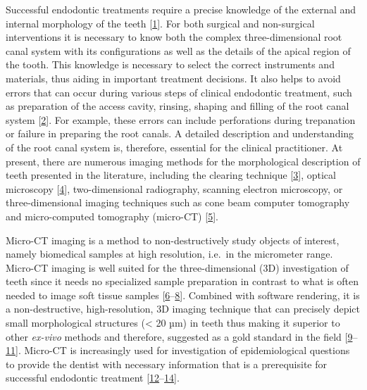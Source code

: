 \documentclass[
  american,
]{article}
\begin{document}
Successful endodontic treatments require a precise knowledge of the external and internal morphology of the teeth {[}\protect\hyperlink{ref-q3HKadWY}{1}{]}.
For both surgical and non-surgical interventions it is necessary to know both the complex three-dimensional root canal system with its configurations as well as the details of the apical region of the tooth.
This knowledge is necessary to select the correct instruments and materials, thus aiding in important treatment decisions.
It also helps to avoid errors that can occur during various steps of clinical endodontic treatment, such as preparation of the access cavity, rinsing, shaping and filling of the root canal system {[}\protect\hyperlink{ref-AHVImOFB}{2}{]}.
For example, these errors can include perforations during trepanation or failure in preparing the root canals.
A detailed description and understanding of the root canal system is, therefore, essential for the clinical practitioner.
At present, there are numerous imaging methods for the morphological description of teeth presented in the literature, including the clearing technique {[}\protect\hyperlink{ref-11Kln4Lf0}{3}{]}, optical microscopy {[}\protect\hyperlink{ref-gA7iMD0q}{4}{]}, two-dimensional radiography, scanning electron microscopy, or three-dimensional imaging techniques such as cone beam computer tomography and micro-computed tomography (micro-CT) {[}\protect\hyperlink{ref-1HkTk4VKM}{5}{]}.

Micro-CT imaging is a method to non-destructively study objects of interest, namely biomedical samples at high resolution, i.e.~in the micrometer range.
Micro-CT imaging is well suited for the three-dimensional (3D) investigation of teeth since it needs no specialized sample preparation in contrast to what is often needed to
image soft tissue samples {[}\protect\hyperlink{ref-XahGmSLJ}{6}--\protect\hyperlink{ref-6C8eCzkj}{8}{]}.
Combined with software rendering, it is a non-destructive, high-resolution, 3D imaging technique that can precisely depict small morphological structures (\textless{} 20 µm) in teeth thus making it superior to other \emph{ex-vivo} methods and therefore, suggested as a gold standard in the field {[}\protect\hyperlink{ref-pTcCEU9H}{9}--\protect\hyperlink{ref-19T8cyNhk}{11}{]}.
Micro-CT is increasingly used for investigation of epidemiological questions to provide the dentist with necessary information that is a prerequisite for successful endodontic treatment {[}\protect\hyperlink{ref-OttTicsv}{12}--\protect\hyperlink{ref-RUBxFFUa}{14}{]}.
\end{document}
